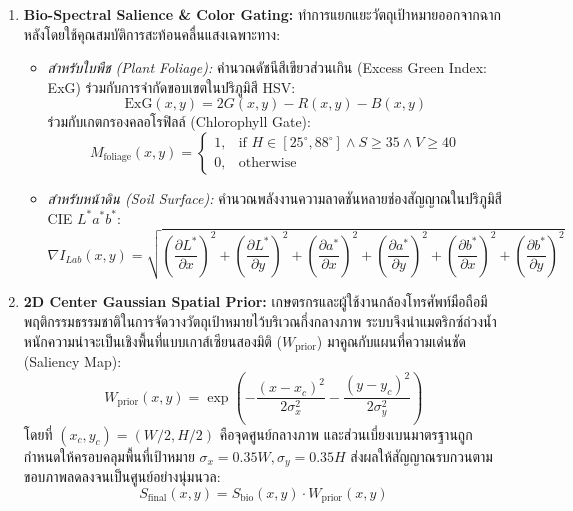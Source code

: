 \begin{enumerate}
    \item \textbf{Bio-Spectral Salience \& Color Gating:}
    ทำการแยกแยะวัตถุเป้าหมายออกจากฉากหลังโดยใช้คุณสมบัติการสะท้อนคลื่นแสงเฉพาะทาง:
    \begin{itemize}
        \item \textit{สำหรับใบพืช (Plant Foliage):} คำนวณดัชนีสีเขียวส่วนเกิน (Excess Green Index: ExG) ร่วมกับการจำกัดขอบเขตในปริภูมิสี HSV:
        \begin{equation}
            \text{ExG}(x, y) = 2G(x, y) - R(x, y) - B(x, y)
        \end{equation}
        ร่วมกับเกตกรองคลอโรฟิลล์ (Chlorophyll Gate):
        \begin{equation}
            M_\text{foliage}(x, y) = \begin{cases} 
            1, & \text{if } H \in [25^\circ, 88^\circ] \land S \ge 35 \land V \ge 40 \\ 
            0, & \text{otherwise} 
            \end{cases}
        \end{equation}
        \item \textit{สำหรับหน้าดิน (Soil Surface):} คำนวณพลังงานความลาดชันหลายช่องสัญญาณในปริภูมิสี CIE $L^*a^*b^*$:
        \begin{equation}
            \nabla I_{Lab}(x, y) = \sqrt{\left(\frac{\partial L^*}{\partial x}\right)^2 + \left(\frac{\partial L^*}{\partial y}\right)^2 + \left(\frac{\partial a^*}{\partial x}\right)^2 + \left(\frac{\partial a^*}{\partial y}\right)^2 + \left(\frac{\partial b^*}{\partial x}\right)^2 + \left(\frac{\partial b^*}{\partial y}\right)^2}
        \end{equation}
    \end{itemize}

    \item \textbf{2D Center Gaussian Spatial Prior:}
    เกษตรกรและผู้ใช้งานกล้องโทรศัพท์มือถือมีพฤติกรรมธรรมชาติในการจัดวางวัตถุเป้าหมายไว้บริเวณกึ่งกลางภาพ ระบบจึงนำแมตริกซ์ถ่วงน้ำหนักความน่าจะเป็นเชิงพื้นที่แบบเกาส์เซียนสองมิติ ($W_\text{prior}$) มาคูณกับแผนที่ความเด่นชัด (Saliency Map):
    \begin{equation}
        W_\text{prior}(x, y) = \exp\left( -\frac{(x - x_c)^2}{2\sigma_x^2} - \frac{(y - y_c)^2}{2\sigma_y^2} \right)
    \end{equation}
    โดยที่ $(x_c, y_c) = (W/2, H/2)$ คือจุดศูนย์กลางภาพ และส่วนเบี่ยงเบนมาตรฐานถูกกำหนดให้ครอบคลุมพื้นที่เป้าหมาย $\sigma_x = 0.35W, \sigma_y = 0.35H$ ส่งผลให้สัญญาณรบกวนตามขอบภาพลดลงจนเป็นศูนย์อย่างนุ่มนวล:
    \begin{equation}
        S_\text{final}(x, y) = S_\text{bio}(x, y) \cdot W_\text{prior}(x, y)
    \end{equation}


\end{enumerate}
